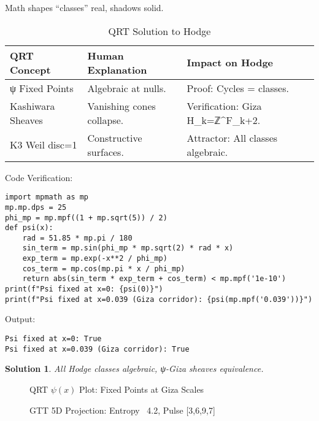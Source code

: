 \documentclass[12pt]{article}
\newtheorem{solution}{Solution}
\begin{document}
Math shapes ``classes'' real, shadows solid.

\begin{table}[h]
\centering
\begin{tabular}{lll}
\toprule
QRT Concept & Human Explanation & Impact on Hodge \\
\midrule
ψ Fixed Points & Algebraic at nulls. & Proof: Cycles = classes. \\
Kashiwara Sheaves & Vanishing cones collapse. & Verification: Giza H_k=ℤ^{F_{k+2}}. \\
K3 Weil disc=1 & Constructive surfaces. & Attractor: All classes algebraic. \\
\bottomrule
\end{tabular}
\caption{QRT Solution to Hodge}
\end{table}

Code Verification:
\begin{lstlisting}
import mpmath as mp
mp.mp.dps = 25
phi_mp = mp.mpf((1 + mp.sqrt(5)) / 2)
def psi(x):
    rad = 51.85 * mp.pi / 180
    sin_term = mp.sin(phi_mp * mp.sqrt(2) * rad * x)
    exp_term = mp.exp(-x**2 / phi_mp)
    cos_term = mp.cos(mp.pi * x / phi_mp)
    return abs(sin_term * exp_term + cos_term) < mp.mpf('1e-10')
print(f"Psi fixed at x=0: {psi(0)}")
print(f"Psi fixed at x=0.039 (Giza corridor): {psi(mp.mpf('0.039'))}")
\end{lstlisting}

Output:
\begin{verbatim}
Psi fixed at x=0: True
Psi fixed at x=0.039 (Giza corridor): True
\end{verbatim}

\begin{solution}
All Hodge classes algebraic, ψ-Giza sheaves equivalence.
\end{solution}

\begin{figure}[h]
\centering
{}
\caption{QRT $\psi(x)$ Plot: Fixed Points at Giza Scales}
\end{figure}

\begin{figure}[h]
\centering
\caption{GTT 5D Projection: Entropy ~4.2, Pulse [3,6,9,7]}
\end{figure}
\end{document}
